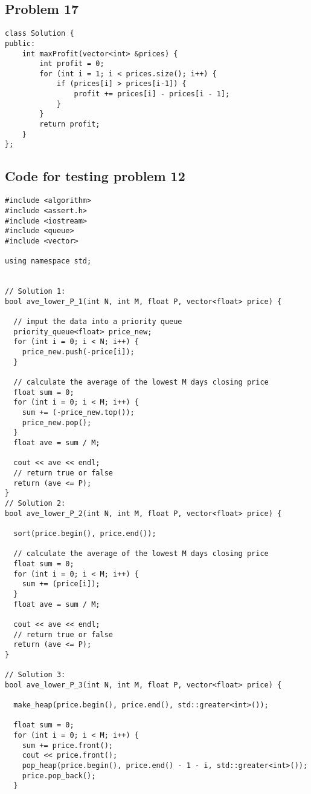 \documentclass[11pt]{article}
\theoremstyle{remark}
\begin{document}
\subsection{Problem 17}
\begin{lstlisting}
class Solution {
public:
    int maxProfit(vector<int> &prices) {
        int profit = 0;
        for (int i = 1; i < prices.size(); i++) {
            if (prices[i] > prices[i-1]) {
                profit += prices[i] - prices[i - 1];
            }
        }
        return profit;
    }
};
\end{lstlisting}

\begin{appendix}
\section{Code for testing problem 12}
\begin{lstlisting}
#include <algorithm>
#include <assert.h>
#include <iostream>
#include <queue>
#include <vector>

using namespace std;


// Solution 1:
bool ave_lower_P_1(int N, int M, float P, vector<float> price) {

  // imput the data into a priority queue
  priority_queue<float> price_new;
  for (int i = 0; i < N; i++) {
    price_new.push(-price[i]);
  }

  // calculate the average of the lowest M days closing price
  float sum = 0;
  for (int i = 0; i < M; i++) {
    sum += (-price_new.top());
    price_new.pop();
  }
  float ave = sum / M;

  cout << ave << endl;
  // return true or false
  return (ave <= P);
}
// Solution 2:
bool ave_lower_P_2(int N, int M, float P, vector<float> price) {

  sort(price.begin(), price.end());

  // calculate the average of the lowest M days closing price
  float sum = 0;
  for (int i = 0; i < M; i++) {
    sum += (price[i]);
  }
  float ave = sum / M;

  cout << ave << endl;
  // return true or false
  return (ave <= P);
}

// Solution 3:
bool ave_lower_P_3(int N, int M, float P, vector<float> price) {

  make_heap(price.begin(), price.end(), std::greater<int>());

  float sum = 0;
  for (int i = 0; i < M; i++) {
    sum += price.front();
    cout << price.front();
    pop_heap(price.begin(), price.end() - 1 - i, std::greater<int>());
    price.pop_back();
  }


\end{lstlisting}
\end{appendix}
\end{document}
